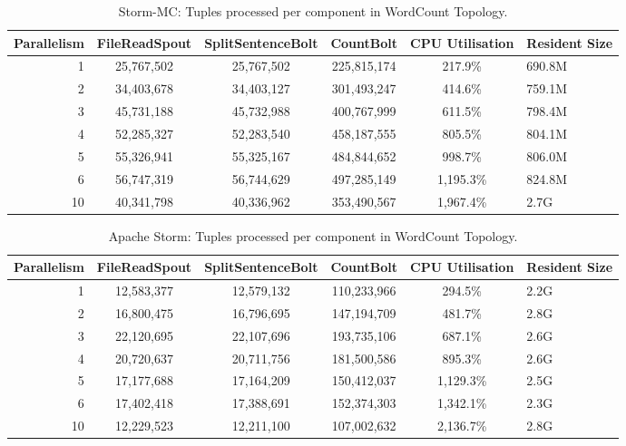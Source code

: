 \begin{table}[!htb]
\begin{adjustwidth}{-0.5in}{-0.5in}
\centering
\small
\begin{tabular}{@{}rccccl@{}}
    \textbf{Parallelism} & \textbf{FileReadSpout} & \textbf{SplitSentenceBolt} & \textbf{CountBolt} & \textbf{CPU Utilisation} & \textbf{Resident Size} \\ \toprule
    1 & {25,767,502} & {25,767,502} & {225,815,174} & {217.9\%} & {690.8M} \\
    2 & {34,403,678} & {34,403,127} & {301,493,247} & {414.6\%} & {759.1M} \\
    3 & {45,731,188} & {45,732,988} & {400,767,999} & {611.5\%} & {798.4M} \\
    4 & {52,285,327} & {52,283,540} & {458,187,555} & {805.5\%} & {804.1M} \\
	5 & {55,326,941} & {55,325,167} & {484,844,652} & {998.7\%} & {806.0M} \\
	6 & {56,747,319} & {56,744,629} & {497,285,149} & {1,195.3\%} & {824.8M} \\
	10 & {40,341,798} & {40,336,962} & {353,490,567} & {1,967.4\%} & {2.7G} \\
\end{tabular}
\caption{Storm-MC: Tuples processed per component in WordCount Topology.}
\label{table:storm_mc_wordcount}
\end{adjustwidth}
\end{table}

\begin{table}[!htb]
\begin{adjustwidth}{-0.5in}{-0.5in}
\centering
\small
\begin{tabular}{@{}rccccl@{}}
    \textbf{Parallelism} & \textbf{FileReadSpout} & \textbf{SplitSentenceBolt} & \textbf{CountBolt} & \textbf{CPU Utilisation} & \textbf{Resident Size} \\ \toprule
    1 & {12,583,377} & {12,579,132} & {110,233,966} & {294.5\%} & {2.2G} \\
    2 & {16,800,475} & {16,796,695} & {147,194,709} & {481.7\%} & {2.8G} \\
    3 & {22,120,695} & {22,107,696} & {193,735,106} & {687.1\%} & {2.6G} \\
    4 & {20,720,637} & {20,711,756} & {181,500,586} & {895.3\%} & {2.6G} \\
	5 & {17,177,688} & {17,164,209} & {150,412,037} & {1,129.3\%} & {2.5G} \\
	6 & {17,402,418} & {17,388,691} & {152,374,303} & {1,342.1\%} & {2.3G} \\
	10 & {12,229,523} & {12,211,100} & {107,002,632} & {2,136.7\%} & {2.8G} \\
\end{tabular}
\caption{Apache Storm: Tuples processed per component in WordCount Topology.}
\label{table:storm_wordcount}
\end{adjustwidth}
\end{table}

